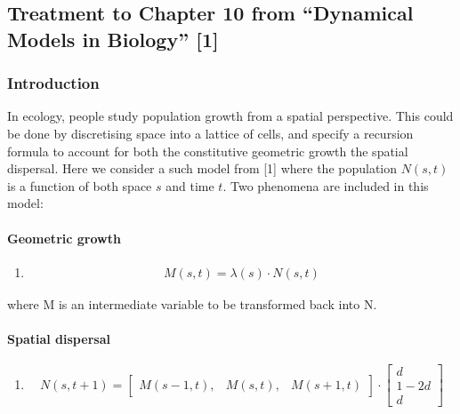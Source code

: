 \documentclass[a4paperpaper,]{article}
\providecommand{\tightlist}{%
  \setlength{\itemsep}{0pt}\setlength{\parskip}{0pt}}
\let\oldparagraph\paragraph
\renewcommand{\paragraph}[1]{\oldparagraph{#1}\mbox{}}
\begin{document}
\subsection{\texorpdfstring{Treatment to Chapter 10 from ``Dynamical
Models in Biology'' {[}1{]}
\label{sec:DMB}}{Treatment to Chapter 10 from Dynamical Models in Biology {[}1{]} }}\label{treatment-to-chapter-10-from-dynamical-models-in-biology-ellner2011}

\subsubsection{Introduction}\label{introduction}

In ecology, people study population growth from a spatial perspective.
This could be done by discretising space into a lattice of cells, and
specify a recursion formula to account for both the constitutive
geometric growth the spatial dispersal. Here we consider a such model
from {[}1{]} where the population \(N(s, t)\) is a function of both
space \(s\) and time \(t\). Two phenomena are included in this model:

\pagebreak[4]

\paragraph{Geometric growth}\label{geometric-growth}

\begin{enumerate}
\def\labelenumi{(\arabic{enumi})}
\tightlist
\item
  \[
  \begin{aligned}
  M(s,t) = \lambda(s) \cdot  N(s,t) 
  \end{aligned}
  \]
\end{enumerate}

where M is an intermediate variable to be transformed back into N.

\paragraph{Spatial dispersal}\label{spatial-dispersal}

\begin{enumerate}
\def\labelenumi{(\arabic{enumi})}
\setcounter{enumi}{1}
\tightlist
\item
  \[
  N(s,t+1) = \begin{bmatrix}M(s-1,t),& M(s,t),&M(s+1,t)\end{bmatrix} \cdot { \begin{bmatrix}d\\ 1-2d\\ d \end{bmatrix} }
  \]
\end{enumerate}
\end{document}
